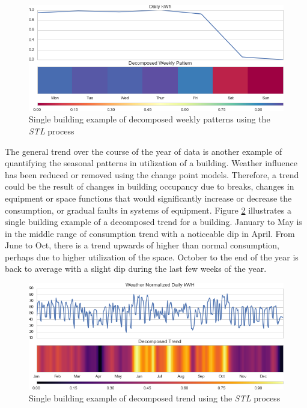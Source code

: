 \begin{figure}[ht!]
\begin{center}
\includegraphics[width=1\columnwidth]{figures/stl_seasonal_example/stl_seasonal_example}
\caption{Single building example of decomposed weekly patterns using the \emph{STL} process
\label{fig:weeklypattern_single}%
}
\end{center}
\end{figure}


The general trend over the course of the year of data is another example of quantifying the seasonal patterns in utilization of a building. Weather influence has been reduced or removed using the change point models. Therefore, a trend could be the result of changes in building occupancy due to breaks, changes in equipment or space functions that would significantly increase or decrease the consumption, or gradual faults in systems of equipment. Figure \ref{fig:trend_single} illustrates a single building example of a decomposed trend for a building. January to May is in the middle range of consumption trend with a noticeable dip in April. From June to Oct, there is a trend upwards of higher than normal consumption, perhaps due to higher utilization of the space. October to the end of the year is back to average with a slight dip during the last few weeks of the year.

\begin{figure}[ht!]
\begin{center}
\includegraphics[width=1\columnwidth]{figures/stl_weathernorm_trend_example/stl_weathernorm_trend_example}
\caption{Single building example of decomposed trend using the \emph{STL} process
\label{fig:trend_single}%
}
\end{center}
\end{figure}


